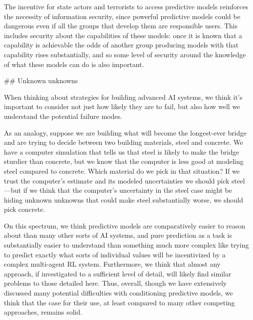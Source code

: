 {{The incentive for state actors and terrorists to access predictive models reinforces the necessity of information security, since powerful predictive models could be dangerous even if all the groups that develop them are responsible users. This includes security about the capabilities of these models: once it is known that a capability is achievable the odds of another group producing models with that capability rises substantially, and so some level of security around the knowledge of what these models can do is also important.


## Unknown unknowns

When thinking about strategies for building advanced AI systems, we think it's important to consider not just how likely they are to fail, but also how well we understand the potential failure modes.

As an analogy, suppose we are building what will become the longest-ever bridge and are trying to decide between two building materials, steel and concrete. We have a computer simulation that tells us that steel is likely to make the bridge sturdier than concrete, but we know that the computer is less good at modeling steel compared to concrete. Which material do we pick in that situation? If we trust the computer's estimate and its modeled uncertainties we should pick steel---but if we think that the computer's uncertainty in the steel case might be hiding unknown unknowns that could make steel substantially worse, we should pick concrete.

On this spectrum, we think predictive models are comparatively easier to reason about than many other sorts of AI systems, and pure prediction as a task is substantially easier to understand than something much more complex like trying to predict exactly what sorts of individual values will be incentivized by a complex multi-agent RL system. Furthermore, we think that almost any approach, if investigated to a sufficient level of detail, will likely find similar problems to those detailed here. Thus, overall, though we have extensively discussed many potential difficulties with conditioning predictive models, we think that the case for their use, at least compared to many other competing approaches, remains solid.

}}

